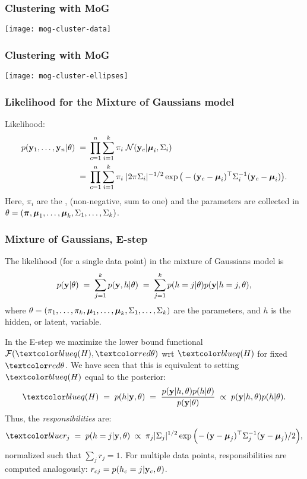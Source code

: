 \begin{frame}
\frametitle{Clustering with MoG}

\centerline{\texttt{[image: mog-cluster-data]}}
\end{frame}

\begin{frame}
\frametitle{Clustering with MoG}

\centerline{\texttt{[image: mog-cluster-ellipses]}}
\end{frame}



\begin{frame}
\frametitle{Likelihood for the Mixture of Gaussians model}

Likelihood:
%
\[
\begin{split}
p(\mathbf y_1,\ldots,\mathbf y_n|\theta)\;=&\;\prod_{c=1}^n\sum_{i=1}^k\pi_i\;{\cal N}
(\mathbf y_c|{\boldsymbol{\mu}}_i,\Sigma_i)\\
=&\;\prod_{c=1}^n\sum_{i=1}^k\pi_i\;|2\pi\Sigma_i|^{-1/2}\exp\big(-
(\mathbf y_c-{\boldsymbol{\mu}}_i)^\top\Sigma_i^{-1}(\mathbf y_c-{\boldsymbol{\mu}}_i)\big).
\end{split}
\]
Here, $\pi_i$ are the , (non-negative, sum to one) and
the parameters are collected in
$\theta=(\boldsymbol{\pi},{\boldsymbol{\mu}}_1,\ldots,{\boldsymbol{\mu}}_k,\Sigma_1,\ldots,\Sigma_k)$.
\end{frame}

\begin{frame}
\frametitle{Mixture of Gaussians, E-step}

The likelihood (for a single data point) in the mixture of Gaussians model is
%
\[
p(\mathbf y|\theta)\;=\;\sum_{j=1}^kp(\mathbf y,h|\theta)\;=\;
\sum_{j=1}^kp(h=j|\theta)p(\mathbf y|h=j,\theta),
\]
%
where
$\theta=(\pi_1,\ldots,\pi_k,{\boldsymbol{\mu}}_1,\ldots,{\boldsymbol{\mu}}_k,\Sigma_1,\ldots,\Sigma_k)$
are the parameters, and $h$ is the hidden, or latent, variable.

In the E-step we maximize the lower bound functional ${\cal
  F}(\Blue{q(H)},\Red{\theta})$ wrt $\Blue{q(H)}$ for fixed $\Red{\theta}$. We
have seen that this is equivalent to setting $\Blue{q(H)}$ equal to the
posterior:
%
\[
\Blue{q(H)}\;=\;p(h|\bfy,\theta)\;=\;
\frac{p(\bfy|h,\theta)p(h|\theta)}{p(\bfy|\theta)}
\;\propto\;p(\bfy|h,\theta)p(h|\theta).
\]
%
Thus, the \emph{responsibilities} are:
%
\[
\Blue{r_j}\;=\;p(h=j|\bfy,\theta)\;\propto\;\pi_j|\Sigma_j|^{1/2}
\exp\Big(\!-(\bfy-\bmu_j)^\top\Sigma_j^{-1}(\bfy-\bmu_j)/2\Big),
\]
%
normalized such that $\sum_jr_j=1$. For multiple data points, responsibilities
are computed analogously: $r_{cj}=p(h_c=j|\mathbf y_c,\theta)$.
\end{frame}

